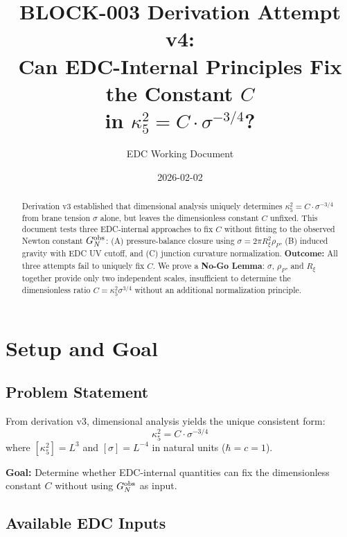 \documentclass[11pt,a4paper]{article}
\title{\textbf{BLOCK-003 Derivation Attempt v4:}\\[0.3em]
Can EDC-Internal Principles Fix the Constant $C$\\
in $\kappa_5^2 = C \cdot \sigma^{-3/4}$?}
\author{EDC Working Document}
\date{2026-02-02}
\theoremstyle{definition}
\begin{document}
\maketitle

\begin{abstract}
Derivation v3 established that dimensional analysis uniquely determines
$\kappa_5^2 = C \cdot \sigma^{-3/4}$ from brane tension $\sigma$ alone, but leaves
the dimensionless constant $C$ unfixed. This document tests three EDC-internal
approaches to fix $C$ without fitting to the observed Newton constant $G_N^{\rm obs}$:
(A) pressure-balance closure using $\sigma = 2\pi R_\xi^2 \rho_P$,
(B) induced gravity with EDC UV cutoff, and
(C) junction curvature normalization.
\textbf{Outcome:} All three attempts fail to uniquely fix $C$. We prove a
\textbf{No-Go Lemma}: $\sigma$, $\rho_P$, and $R_\xi$ together provide only
two independent scales, insufficient to determine the dimensionless ratio
$C = \kappa_5^2 \sigma^{3/4}$ without an additional normalization principle.
\end{abstract}

\tableofcontents
\newpage

\section{Setup and Goal}

\subsection{Problem Statement}

From derivation v3, dimensional analysis yields the unique consistent form:
\begin{equation}
\kappa_5^2 = C \cdot \sigma^{-3/4}
\label{eq:kappa_sigma}
\end{equation}
where $[\kappa_5^2] = L^3$ and $[\sigma] = L^{-4}$ in natural units ($\hbar = c = 1$).

\textbf{Goal:} Determine whether EDC-internal quantities can fix the dimensionless
constant $C$ without using $G_N^{\rm obs}$ as input.

\subsection{Available EDC Inputs}
\end{document}
